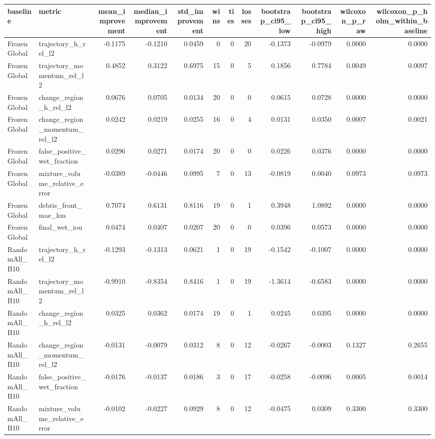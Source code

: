 \begin{tabular}{llrrrrrrrrrr}
\toprule
baseline & metric & mean\_improvement & median\_improvement & std\_improvement & wins & ties & losses & bootstrap\_ci95\_low & bootstrap\_ci95\_high & wilcoxon\_p\_raw & wilcoxon\_p\_holm\_within\_baseline \\
\midrule
FrozenGlobal & trajectory\_h\_rel\_l2 & -0.1175 & -0.1210 & 0.0459 & 0 & 0 & 20 & -0.1373 & -0.0979 & 0.0000 & 0.0000 \\
FrozenGlobal & trajectory\_momentum\_rel\_l2 & 0.4852 & 0.3122 & 0.6975 & 15 & 0 & 5 & 0.1856 & 0.7784 & 0.0049 & 0.0097 \\
FrozenGlobal & change\_region\_h\_rel\_l2 & 0.0676 & 0.0705 & 0.0134 & 20 & 0 & 0 & 0.0615 & 0.0728 & 0.0000 & 0.0000 \\
FrozenGlobal & change\_region\_momentum\_rel\_l2 & 0.0242 & 0.0219 & 0.0255 & 16 & 0 & 4 & 0.0131 & 0.0350 & 0.0007 & 0.0021 \\
FrozenGlobal & false\_positive\_wet\_fraction & 0.0296 & 0.0271 & 0.0174 & 20 & 0 & 0 & 0.0226 & 0.0376 & 0.0000 & 0.0000 \\
FrozenGlobal & mixture\_volume\_relative\_error & -0.0389 & -0.0446 & 0.0995 & 7 & 0 & 13 & -0.0819 & 0.0040 & 0.0973 & 0.0973 \\
FrozenGlobal & debris\_front\_mae\_km & 0.7074 & 0.6131 & 0.8116 & 19 & 0 & 1 & 0.3948 & 1.0892 & 0.0000 & 0.0000 \\
FrozenGlobal & final\_wet\_iou & 0.0474 & 0.0407 & 0.0207 & 20 & 0 & 0 & 0.0396 & 0.0573 & 0.0000 & 0.0000 \\
RandomAll\_B10 & trajectory\_h\_rel\_l2 & -0.1293 & -0.1313 & 0.0621 & 1 & 0 & 19 & -0.1542 & -0.1007 & 0.0000 & 0.0000 \\
RandomAll\_B10 & trajectory\_momentum\_rel\_l2 & -0.9910 & -0.8354 & 0.8416 & 1 & 0 & 19 & -1.3614 & -0.6583 & 0.0000 & 0.0000 \\
RandomAll\_B10 & change\_region\_h\_rel\_l2 & 0.0325 & 0.0362 & 0.0174 & 19 & 0 & 1 & 0.0245 & 0.0395 & 0.0000 & 0.0000 \\
RandomAll\_B10 & change\_region\_momentum\_rel\_l2 & -0.0131 & -0.0079 & 0.0312 & 8 & 0 & 12 & -0.0267 & -0.0003 & 0.1327 & 0.2655 \\
RandomAll\_B10 & false\_positive\_wet\_fraction & -0.0176 & -0.0137 & 0.0186 & 3 & 0 & 17 & -0.0258 & -0.0096 & 0.0005 & 0.0014 \\
RandomAll\_B10 & mixture\_volume\_relative\_error & -0.0102 & -0.0227 & 0.0929 & 8 & 0 & 12 & -0.0475 & 0.0309 & 0.3300 & 0.3300 \\

\end{tabular}
